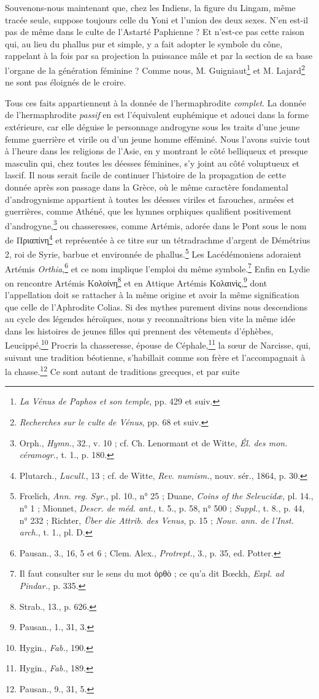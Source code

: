 \documentclass[a4paper, 11pt, oneside]{article}
\begin{document}
Souvenons-nous maintenant que, chez les Indiens, la figure du Lingam, même tracée seule, suppose toujours celle du Yoni et l'union des deux sexes. N'en est-il pas de même dans le culte de l'Astarté Paphienne ? Et n'est-ce pas cette raison qui, au lieu du phallus pur et simple, y a fait adopter le symbole du cône, rappelant à la fois par sa projection la puissance mâle et par la section de sa base l'organe de la génération féminine ? Comme nous, M. Guigniaut\footnote{\emph{La Vénus de Paphos et son temple}, pp. 429 et suiv.} et M. Lajard\footnote{\emph{Recherches sur le culte de Vénus}, pp. 68 et suiv.} ne sont pas éloignés de le croire.

Tous ces faits appartiennent à la donnée de l'hermaphrodite \emph{complet}. La donnée de l'hermaphrodite \emph{passif} en est l'équivalent euphémique et adouci dans la forme extérieure, car elle déguise le personnage androgyne sous les traits d'une jeune femme guerrière et virile ou d'un jeune homme efféminé. Nous l'avons suivie tout à l'heure dans les religions de l'Asie, en y montrant le côté belliqueux et presque masculin qui, chez toutes les déesses féminines, s'y joint au côté voluptueux et lascif. Il nous serait facile de continuer l'histoire de la propagation de cette donnée après son passage dans la Grèce, où le même caractère fondamental d'androgynisme appartient à toutes les déesses viriles et farouches, armées et guerrières, comme Athéné, que les hymnes orphiques qualifient positivement d'androgyne,\footnote{Orph., \emph{Hymn.}, 32., v. 10 ; cf. Ch. Lenormant et de Witte, \emph{Él. des mon. céramogr.}, t. 1., p. 180.} ou chasseresses, comme Artémis, adorée dans le Pont sous le nom de Πριαπίνη\footnote{Plutarch., \emph{Lucull.}, 13 ; cf. de Witte, \emph{Rev. numism.}, nouv. sér., 1864, p. 30.} et représentée à ce titre sur un tétradrachme d'argent de Démétrius 2, roi de Syrie, barbue et environnée de phallus.\footnote{Frœlich, \emph{Ann. reg. Syr.}, pl. 10., n° 25 ; Duane, \emph{Coins of the Seleucidæ}, pl. 14., n° 1 ; Mionnet, \emph{Descr. de méd. ant.}, t. 5., p. 58, n° 500 ; \emph{Suppl.}, t. 8., p. 44, n° 232 ; Richter, \emph{Über die Attrib. des Venus}, p. 15 ; \emph{Nouv. ann. de l'Inst. arch.}, t. 1., pl. D.} Les Lacédémoniens adoraient Artémis \emph{Orthia},\footnote{Pausan., 3., 16, 5 et 6 ; Clem. Alex., \emph{Protrept.}, 3., p. 35, ed. Potter.} et ce nom implique l'emploi du même symbole.\footnote{Il faut consulter sur le sens du mot ὀρθὸ ; ce qu'a dit Bœckh, \emph{Expl. ad Pindar.}, p. 335.} Enfin en Lydie on rencontre Artémis Κολοίνη\footnote{Strab., 13., p. 626.} et en Attique Artémis Κολαινὶς,\footnote{Pausan., 1., 31, 3.} dont l'appellation doit se rattacher à la même origine et avoir la même signification que celle de l'Aphrodite Colias. Si des mythes purement divins nous descendions au cycle des légendes héroïques, nous y reconnaîtrions bien vite la même idée dans les histoires de jeunes filles qui prennent des vêtements d'éphèbes, Leucippé,\footnote{Hygin., \emph{Fab.}, 190.} Procris la chasseresse, épouse de Céphale,\footnote{Hygin., \emph{Fab.}, 189.} la sœur de Narcisse, qui, suivant une tradition béotienne, s'habillait comme son frère et l'accompagnait à la chasse.\footnote{Pausan., 9., 31, 5.} Ce sont autant de traditions grecques, et par suite 
\end{document}
